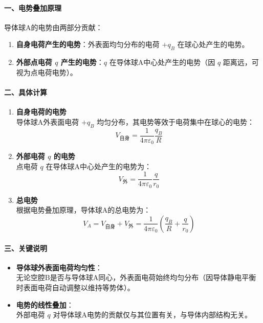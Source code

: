 \documentclass{article}
\begin{document}
{\paragraph*{一、电势叠加原理}

导体球A的电势由两部分贡献：  
\begin{enumerate}
    \item \textbf{自身电荷产生的电势}：外表面均匀分布的电荷 \(+q_B\) 在球心处产生的电势。  
    \item \textbf{外部点电荷 \(q\) 产生的电势}：\(q\) 在导体球A中心处产生的电势（因 \(q\) 距离远，可视为点电荷电势）。
\end{enumerate}



\paragraph*{二、具体计算}

\begin{enumerate}
    \item \textbf{自身电荷的电势}  \\
    {\color{red}导体球A外表面电荷 \(+q_B\) 均匀分布，其电势等效于电荷集中在球心的电势}：  
    \[
    V_{\text{自身}} = \frac{1}{4\pi\varepsilon_0} \frac{q_B}{R}
    \]

    \item \textbf{外部电荷 \(q\) 的电势}  \\
    点电荷 \(q\) 在导体球A中心处产生的电势为：  
    \[
    V_{\text{外}} = \frac{1}{4\pi\varepsilon_0} \frac{q}{r_0}
    \]

    \item \textbf{总电势}  \\
    根据电势叠加原理，导体球A的总电势为：  
    \[
    V_A = V_{\text{自身}} + V_{\text{外}} = \frac{1}{4\pi\varepsilon_0} \left( \frac{q_B}{R} + \frac{q}{r_0} \right)
    \]
\end{enumerate}


\paragraph*{三、关键说明}

\begin{itemize}
    \item \textbf{导体球外表面电荷均匀性}：  \\
    无论空腔B是否与导体球A同心，外表面电荷始终均匀分布（因导体静电平衡时表面电荷自动调整以维持等势体）。  
    \item \textbf{电势的线性叠加}：  \\
    外部电荷 \(q\) 对导体球A电势的贡献仅与其位置有关，与导体内部结构无关。
\end{itemize}


}
\end{document}
